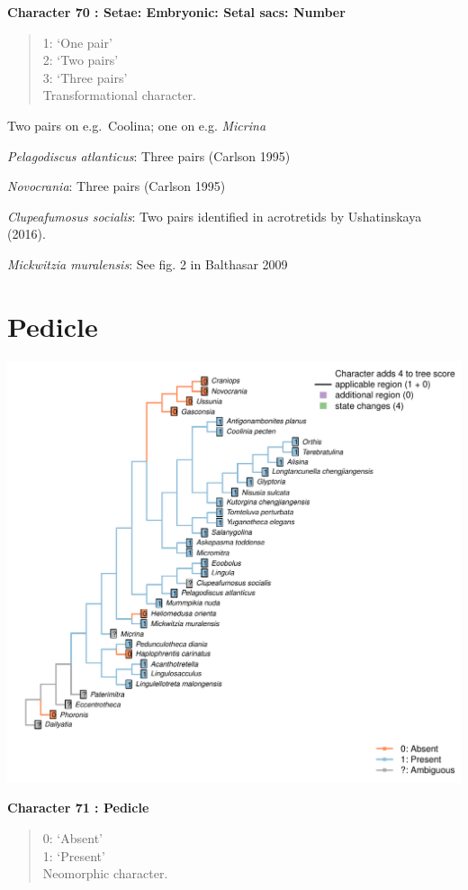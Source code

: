 \documentclass[]{book}
\theoremstyle{definition}
\theoremstyle{definition}
\theoremstyle{definition}
\theoremstyle{remark}
\begin{document}
\textbf{Character 70 : Setae: Embryonic: Setal sacs: Number }

\begin{quote}
1: `One pair'\\
2: `Two pairs'\\
3: `Three pairs'\\
Transformational character.
\end{quote}

Two pairs on e.g.~Coolina; one on e.g. \emph{Micrina}

\emph{Pelagodiscus atlanticus}: Three pairs (Carlson 1995)

\emph{Novocrania}: Three pairs (Carlson 1995)

\emph{Clupeafumosus socialis}: Two pairs identified in acrotretids by
Ushatinskaya (2016).

\emph{Mickwitzia muralensis}: See fig. 2 in Balthasar 2009

\hypertarget{pedicle}{%
\section*{Pedicle}\label{pedicle}}

\includegraphics{Brachiopod_phylogeny_files/figure-latex/unnamed-chunk-5-71.pdf}

\textbf{Character 71 : Pedicle }

\begin{quote}
0: `Absent'\\
1: `Present'\\
Neomorphic character.
\end{quote}
\end{document}
